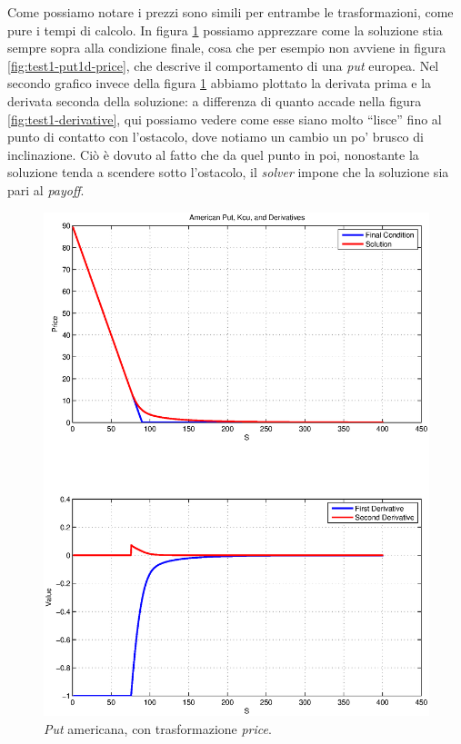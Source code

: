 \documentclass[a4paper,10pt]{report}
\theoremstyle{plain}
\theoremstyle{definition}
\theoremstyle{remark}
\begin{document}
Come possiamo notare i prezzi sono simili per entrambe le trasformazioni, come pure i tempi di calcolo. In figura \ref{fig:test2-putamkou} possiamo apprezzare come la soluzione stia sempre sopra alla condizione finale, cosa che per esempio non avviene in figura \ref{fig:test1-put1d-price}, che descrive il comportamento di una \emph{put} europea. Nel secondo grafico invece della figura \ref{fig:test2-putamkou} abbiamo plottato la derivata prima e la derivata seconda della soluzione: a differenza di quanto accade nella figura \ref{fig:test1-derivative}, qui possiamo vedere come esse siano molto ``lisce'' fino al punto di contatto con l'ostacolo, dove notiamo un cambio un po' brusco di inclinazione. Ci\`o \`e dovuto al fatto che da quel punto in poi, nonostante la soluzione tenda a scendere sotto l'ostacolo, il \emph{solver} impone che la soluzione sia pari al \emph{payoff}.
\begin{figure}[htp!]
\begin{center}
\includegraphics[width=\textwidth]{img/test2-putamkou.eps}
\caption{\emph{Put} americana, con trasformazione \emph{price}.}
\label{fig:test2-putamkou}
\end{center}
\end{figure}
\newpage
\end{document}
